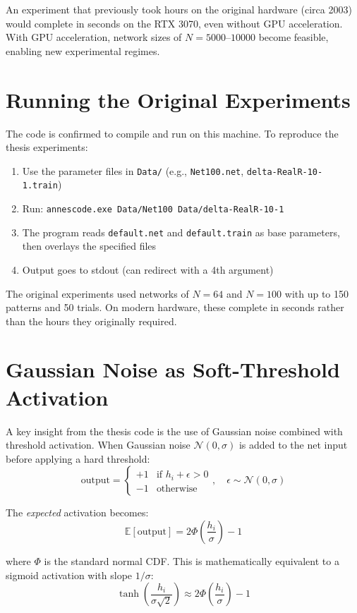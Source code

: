 \documentclass[11pt,a4paper]{article}
\begin{document}
An experiment that previously took hours on the original hardware (circa 2003) would complete in seconds on the RTX 3070, even without GPU acceleration. With GPU acceleration, network sizes of $N=5000$--$10000$ become feasible, enabling new experimental regimes.

\section{Running the Original Experiments}

The code is confirmed to compile and run on this machine. To reproduce the thesis experiments:

\begin{enumerate}
    \item Use the parameter files in \texttt{Data/} (e.g., \texttt{Net100.net}, \texttt{delta-RealR-10-1.train})
    \item Run: \texttt{annescode.exe Data/Net100 Data/delta-RealR-10-1}
    \item The program reads \texttt{default.net} and \texttt{default.train} as base parameters, then overlays the specified files
    \item Output goes to stdout (can redirect with a 4th argument)
\end{enumerate}

The original experiments used networks of $N=64$ and $N=100$ with up to 150 patterns and 50 trials. On modern hardware, these complete in seconds rather than the hours they originally required.

\section{Gaussian Noise as Soft-Threshold Activation}

A key insight from the thesis code is the use of Gaussian noise combined with threshold activation. When Gaussian noise $\mathcal{N}(0, \sigma)$ is added to the net input before applying a hard threshold:
\[
\text{output} = \begin{cases} +1 & \text{if } h_i + \epsilon > 0 \\ -1 & \text{otherwise} \end{cases}, \quad \epsilon \sim \mathcal{N}(0, \sigma)
\]

The \emph{expected} activation becomes:
\[
\mathbb{E}[\text{output}] = 2\Phi\left(\frac{h_i}{\sigma}\right) - 1
\]

where $\Phi$ is the standard normal CDF. This is mathematically equivalent to a sigmoid activation with slope $1/\sigma$:
\[
\tanh\left(\frac{h_i}{\sigma\sqrt{2}}\right) \approx 2\Phi\left(\frac{h_i}{\sigma}\right) - 1
\]
\end{document}
